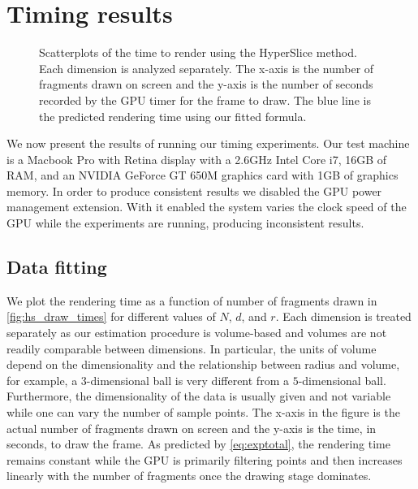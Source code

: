 \section{Timing results}
\label{sec:timingresults}

\begin{figure*}[t]
  \centering
  
  \caption[Scatterplots of the time to render using the HyperSlice method.]{%
    Scatterplots of the time to render using the HyperSlice method.
    Each dimension is analyzed separately.  The x-axis is the number of
    fragments drawn on screen and the y-axis is the number of seconds
    recorded by the GPU timer for the frame to draw.
    The blue line is the predicted rendering time using our fitted 
    formula. 
  }
  \label{fig:hs_draw_times}
\end{figure*}

We now present the results of running our timing experiments.  Our test
machine is a Macbook Pro with Retina display with a 2.6GHz Intel Core i7, 16GB
of RAM, and an NVIDIA GeForce GT 650M graphics card with 1GB of graphics
memory.  In order to produce consistent results we disabled the GPU power
management extension.  With it enabled the system varies the clock speed of
the GPU while the experiments are running, producing inconsistent results.

\subsection{Data fitting}
\label{sec:datafitting}

We plot the rendering time as a function of number of fragments
drawn in \autoref{fig:hs_draw_times} for different values of $N$, $d$, and $r$. 
Each dimension is treated separately as our estimation procedure is volume-based
and volumes are not readily comparable between dimensions.  
In particular, the units of volume depend on the dimensionality and the 
relationship between radius and volume,
for example, a $3$-dimensional ball is very different from a
$5$-dimensional ball.
Furthermore, the dimensionality of the data is usually given and not 
variable while one can vary the number of sample points.
The x-axis in the figure is
the actual number of fragments drawn on screen and the y-axis is the 
time, in seconds, to draw the frame.  As predicted by \autoref{eq:exptotal},
the rendering time remains constant while the GPU is primarily filtering 
points and then increases linearly with the number of fragments once the 
drawing stage dominates.

